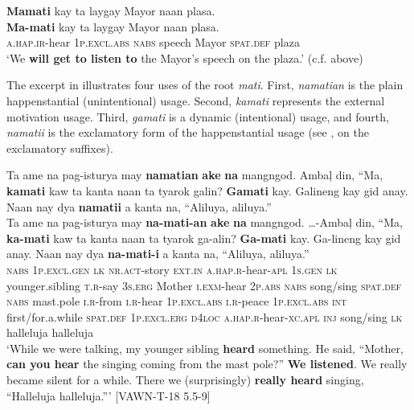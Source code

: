 \ea
\textbf{Mamati}  kay  ta  laygay  Mayor  naan  plasa. \\\smallskip
\gll \textbf{Ma-mati}  kay  ta  laygay  Mayor  naan  plasa. \\
\textsc{a.hap.ir}-hear  1\textsc{p.excl.abs}  \textsc{nabs}  speech  Mayor  \textsc{spat.def}  plaza \\
\glt ‘We \textbf{will get to listen to} the Mayor’s speech on the plaza.’ (c.f.  above)
\z

The excerpt in  illustrates four uses of the root \textit{mati}. First, \textit{namatian} is the plain happenstantial (unintentional) usage. Second, \textit{kamati} represents the external motivation usage. Third, \textit{gamati} is a dynamic (intentional) usage, and fourth, \textit{namatii} is the exclamatory form of the happenstantial usage (see ,  on the exclamatory suffixes).

\ea
\label{bkm:Ref121310939}
Ta  ame  na  pag-isturya  may  \textbf{namatian}  \textbf{ake}  \textbf{na}   mangngod.  Ambaļ  din,  “Ma,  \textbf{kamati}  kaw  ta  kanta naan  ta  tyarok  galin?  \textbf{Gamati}  kay. Galineng  kay   gid  anay.  Naan  nay  dya  \textbf{namatii}  a kanta  na,  “Aliluya,  aliluya.”\\\smallskip
\gll Ta  ame  na  pag-isturya  may  \textbf{na-mati-an}  \textbf{ake}  \textbf{na}   mangngod.   …-Ambaļ  din,  “Ma,  \textbf{ka-mati}  kaw  ta  kanta naan  ta  tyarok  ga-alin?  \textbf{Ga-mati}  kay.  Ga-lineng  kay   gid  anay.  Naan  nay  dya  \textbf{na-mati-i}  a kanta  na,  “Aliluya,  aliluya.”\\
\textsc{nabs}  1\textsc{p.excl.gen}  \textsc{lk}  \textsc{nr.act}-story  \textsc{ext.in}  \textsc{a.hap.r}-hear-\textsc{apl}  1\textsc{s.gen}  \textsc{lk}
younger.sibling  \textsc{t.r}-say  3\textsc{s.erg}  Mother  \textsc{i.exm}-hear  2\textsc{p.abs}  \textsc{nabs}  song/sing \textsc{spat.def}  \textsc{nabs}  mast.pole  \textsc{i.r}-from  \textsc{i.r}-hear  1\textsc{p.excl.abs}  \textsc{i.r}-peace
1\textsc{p.excl.abs} \textsc{int}  first/for.a.while  \textsc{spat.def}  1\textsc{p.excl.erg}  \textsc{d4loc}  \textsc{a.hap.r}-hear-\textsc{xc.apl}  \textsc{inj}
  song/sing  \textsc{lk}  halleluja  halleluja \\
\glt `While we were talking, my younger sibling \textbf{heard} something. He said, “Mother, \textbf{can you hear} the singing coming from the mast pole?” \textbf{We listened}. We really became silent for a while. There we (surprisingly) \textbf{really heard} singing, “Halleluja halleluja.”' [VAWN-T-18 5.5-9]
\z

